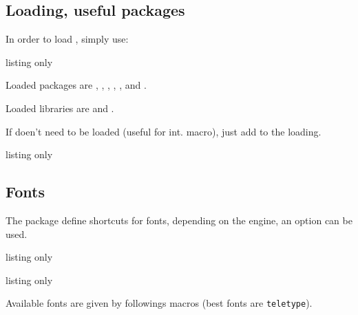 \documentclass[11pt,a4paper]{ltxdoc}
\begin{document}
\subsection{Loading, useful packages}

In order to load , simply use:

\begin{DemoCode}{listing only}
\usepackage{calculatoritems}
\end{DemoCode}

Loaded packages are , , , , ,  and .

Loaded libraries are  and .

\smallskip

If  doen't need to be loaded (useful for int. macro), just add \ShowCode{[noamssymb]} to the loading.

\begin{DemoCode}{listing only}
\usepackage[noamssymb]{calculatoritems}
\end{DemoCode}

\subsection{Fonts}

The package define shortcuts for fonts, depending on the engine, an option \ShowCode{[xelua]} can be used.

\begin{DemoCode}{listing only}
\usepackage{calculatoritems}
\end{DemoCode}

\begin{DemoCode}{listing only}
\usepackage[xelua]{calculatoritems}
\end{DemoCode}

Available fonts are given by followings macros (best fonts are \texttt{teletype}).

\begin{DemoCode}{listing only}
\newcommand\fontNWKS\fontencoding{T1}\selectfont} %
\newcommand\fontCASIOA{%
  \fontencoding{T1}\fontfamily{AnonymousPro}\fontseries{sb}\selectfont %
}
\newcommand\fontCASIOB{%
  \fontencoding{T1}\fontfamily{AlegreyaSans-TLF}\fontseries{sb}\selectfont %
}
\newcommand\fontTI{%
  \fontencoding{T1}\fontfamily{AnonymousPro}\fontseries{sb}\selectfont %
}
\newcommand\fontHP{%
  \fontencoding{T1}\fontfamily{AlegreyaSans-TLF}\fontseries{sb}\selectfont %
}
\newcommand\fontKEY{%
  \fontencoding{T1}\fontfamily{SourceCodePro-TLF}\fontseries{sb}\selectfont %
}
\end{DemoCode}
\end{document}
